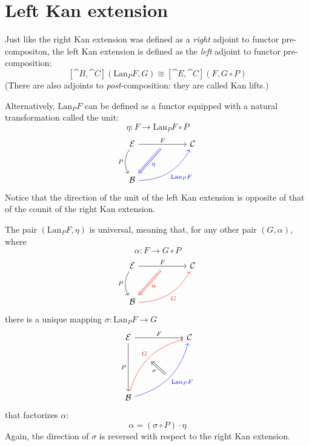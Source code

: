 \documentclass[DaoFP]{subfiles}
\begin{document}
\section{Left Kan extension}

Just like the right Kan extension was defined as a \emph{right} adjoint to functor pre-compositon, the left Kan extension is defined as the \emph{left} adjoint to functor pre-composition:
\[ [\cat B, \cat C](\text{Lan}_P F , G) \cong  [\cat E, \cat C] (F, G \circ P) \]
 (There are also adjoints to \emph{post}-composition: they are called Kan lifts.)

Alternatively, $\text{Lan}_P F$ can be defined as a functor equipped with a natural transformation called the unit:
\[ \eta \colon F \to \text{Lan}_P F \circ P \]
\[
 \begin{tikzcd} [row sep=1cm, column sep=1cm]
 \cat E
 \arrow[rr, "F", "" {name=ID, below} ]
 \arrow[d, bend right, "P"']
 && \cat C
 \\
 \cat B
  \arrow[urr, blue, bend right, "\text{Lan}_P F"']
 \arrow[Rightarrow, blue, "\eta",  from=ID]
 \end{tikzcd}
\]
Notice that the direction of the unit of the left Kan extension is opposite of that of the counit of the right Kan extension.

The pair $(\text{Lan}_P F, \eta)$ is universal, meaning that, for any other pair $(G, \alpha)$, where 
\[ \alpha \colon F \to G \circ P\] 
\[
 \begin{tikzcd} [row sep=1cm, column sep=1cm]
 \cat E
 \arrow[rr, "F", "" {name=ID, below} ]
 \arrow[d, bend right, "P"']
 && \cat C
 \\
 \cat B
  \arrow[urr, red, bend right, "G"']
 \arrow[Rightarrow, red, "\alpha",  from=ID]
 \end{tikzcd}
\]
there is a unique mapping $\sigma \colon \text{Lan}_P F \to G$ 
\[
\begin{tikzcd}[row sep=2cm, column sep=2cm]
\cat E  \ar[d, "P"', "" {name=P}]
            \ar[r, "F", ""  {name=F, below, near start, bend right}]
&
\cat C
\\
\cat B
    \ar[ur, red, bend left, "G", "" {name=G, below}]
    \ar[ur, blue, bend right, "\text{Lan}_P F"', "" {name=Lan}]
\arrow[Rightarrow, "\sigma", from=Lan, to=G]
\end{tikzcd}
\]
that factorizes $\alpha$:
\[ \alpha = (\sigma \circ P) \cdot \eta \]
Again, the direction of $\sigma$ is reversed with respect to the right Kan extension.
\end{document}
